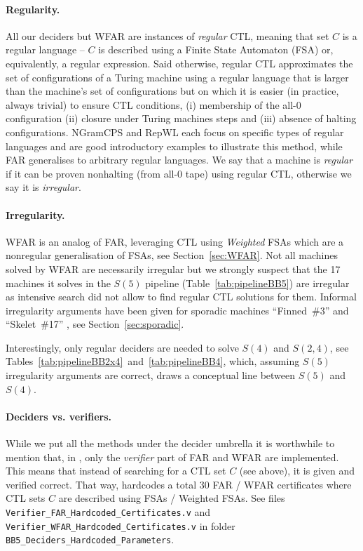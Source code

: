 \paragraph{Regularity.} All our deciders but WFAR are instances of \textit{regular} CTL, meaning that set $C$ is a regular language -- \ie $C$ is described using a Finite State Automaton (FSA) or, equivalently, a regular expression. Said otherwise, regular CTL approximates the set of configurations of a Turing machine using a regular language that is larger than the machine's set of configurations but on which it is easier (in practice, always trivial) to ensure CTL conditions, \ie (i) membership of the all-0 configuration (ii) closure under Turing machines steps and (iii) absence of halting configurations. NGramCPS and RepWL each focus on specific types of regular languages and are good introductory examples to illustrate this method, while FAR generalises to arbitrary regular languages. We say that a machine is \textit{regular} if it can be proven nonhalting (from all-0 tape) using regular CTL, otherwise we say it is \textit{irregular}.

\paragraph{Irregularity.} WFAR is an analog of FAR, leveraging CTL using \textit{Weighted} FSAs which are a nonregular generalisation of FSAs, see Section~\ref{sec:WFAR}. Not all machines solved by WFAR are necessarily irregular but we strongly suspect that the 17 machines it solves in the $S(5)$ pipeline (Table~\ref{tab:pipelineBB5}) are irregular as intensive search did not allow to find regular CTL solutions for them. Informal irregularity arguments have been given for sporadic machines ``Finned~\#3'' and ``Skelet~\#17'' \cite{irregularFinned3, irregularSk17}, see Section~\ref{sec:sporadic}.

Interestingly, only regular deciders are needed to solve $S(4)$ and $S(2,4)$, see Tables~\ref{tab:pipelineBB2x4}~and~\ref{tab:pipelineBB4}, which, assuming $S(5)$ irregularity arguments are correct, draws a conceptual line between $S(5)$ and $S(4)$.

\paragraph{Deciders vs. verifiers.} While we put all the methods under the decider umbrella it is worthwhile to mention that, in \CoqBB, only the \textit{verifier} part of FAR and WFAR are implemented. This means that instead of searching for a CTL set $C$ (see above), it is given and verified correct. That way, \CoqBB hardcodes a total $30$ FAR /
WFAR certificates where CTL sets $C$ are described using FSAs / Weighted FSAs. See files \texttt{Verifier\_FAR\_Hardcoded\_Certificates.v} and \texttt{Verifier\_WFAR\_Hardcoded\_Certificates.v} in folder \texttt{BB5\_Deciders\_Hardcoded\_Parameters}.

